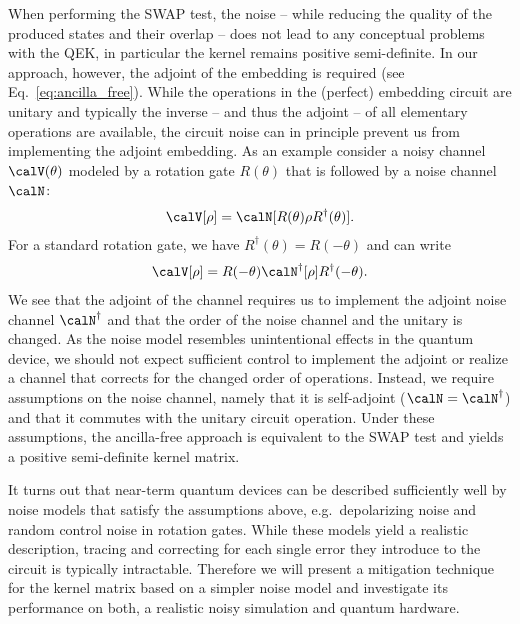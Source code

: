 \documentclass[twocolumn,superscriptaddress,nofootinbib]{revtex4-2}
\begin{document}
When performing the SWAP test, the noise -- while reducing the quality of the produced states and their overlap -- does not lead to any conceptual problems with the \ac{QEK}, in particular the kernel remains positive semi-definite.
In our approach, however, the adjoint of the embedding is required (see Eq.~\eqref{eq:ancilla_free}).
While the operations in the (perfect) embedding circuit are unitary and typically the inverse -- and thus the adjoint -- of all elementary operations are available, the circuit noise can in principle prevent us from implementing the adjoint embedding.
As an example consider a noisy channel $\calV(\theta)$ modeled by a rotation gate $R(\theta)$ that is followed by a noise channel $\calN$:
\begin{align}
    \calV[\rho] = \calN[R(\theta) \rho R^{\dagger}(\theta)].
\end{align}
For a standard rotation gate, we have $R^\dagger(\theta)=R(-\theta)$ and can write
\begin{align}
    \calV[\rho] = R(-\theta) \calN^\dagger[\rho ] R^{\dagger}(-\theta).
\end{align}
We see that the adjoint of the channel requires us to implement the adjoint noise channel $\calN^\dagger$ and that the order of the noise channel and the unitary is changed.
As the noise model resembles unintentional effects in the quantum device, we should not expect sufficient control to implement the adjoint or realize a channel that corrects for the changed order of operations. Instead, we require assumptions on the noise channel, namely that it is self-adjoint ($\calN=\calN^\dagger$) and that it commutes with the unitary circuit operation.
Under these assumptions, the ancilla-free approach is equivalent to the SWAP test and yields a positive semi-definite kernel matrix. 

It turns out that near-term quantum devices can be described sufficiently well by noise models that satisfy the assumptions above, e.g.~depolarizing noise and random control noise in rotation gates.
While these models yield a realistic description, tracing and correcting for each single error they introduce to the circuit is typically intractable.
Therefore we will present a mitigation technique for the kernel matrix based on a simpler noise model and investigate its performance on both, a realistic noisy simulation and quantum hardware.

\end{document}
